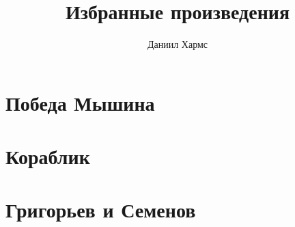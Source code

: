 \documentclass[a4paper,12pt]{book}
\title{Избранные произведения}
\author{Даниил Хармс}
\date{}
\begin{document}
\maketitle

\chapter{Победа Мышина}


\chapter{Кораблик}


\chapter{Григорьев и Семенов}

\end{document}
